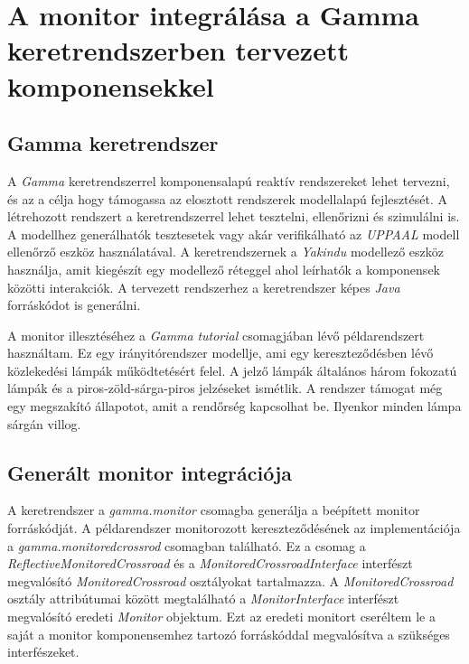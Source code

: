 \chapter{A monitor integrálása a Gamma keretrendszerben tervezett komponensekkel}

\section{Gamma keretrendszer}

A \textit{Gamma} keretrendszerrel komponensalapú reaktív rendszereket lehet tervezni, és az a célja hogy támogassa az elosztott rendszerek modellalapú fejlesztését.
A létrehozott rendszert a keretrendszerrel lehet tesztelni, ellenőrizni és szimulálni is.
A modellhez generálhatók tesztesetek vagy akár verifikálható az \textit{UPPAAL} modell ellenőrző eszköz használatával.
A keretrendszernek a \textit{Yakindu} modellező eszköz használja, amit kiegészít egy modellező réteggel ahol leírhatók a komponensek közötti interakciók.
A tervezett rendszerhez a keretrendszer képes \textit{Java} forráskódot is generálni.

A monitor illesztéséhez a \textit{Gamma} \textit{tutorial} csomagjában lévő példarendszert használtam.
Ez egy irányitórendszer modellje, ami egy kereszteződésben lévő közlekedési lámpák működtetésért felel.
A jelző lámpák általános három fokozatú lámpák és a piros-zöld-sárga-piros jelzéseket ismétlik.
A rendszer támogat még egy megszakító állapotot, amit a rendőrség kapcsolhat be.
Ilyenkor minden lámpa sárgán villog.

\section{Generált monitor integrációja}

A keretrendszer a \textit{gamma.monitor} csomagba generálja a beépített monitor forráskódját.
A példarendszer monitorozott kereszteződésének az implementációja a \textit{gamma.monitoredcrossrod} csomagban található.
Ez a csomag a \textit{ReflectiveMonitoredCrossroad} és a \textit{MonitoredCrossroadInterface} interfészt megvalósító \textit{MonitoredCrossroad} osztályokat tartalmazza.
A \textit{MonitoredCrossroad} osztály attribútumai között megtalálható a \textit{MonitorInterface} interfészt megvalósító eredeti \textit{Monitor} objektum.
Ezt az eredeti monitort cseréltem le a saját a monitor komponensemhez tartozó forráskóddal megvalósítva a szükséges interfészeket.

